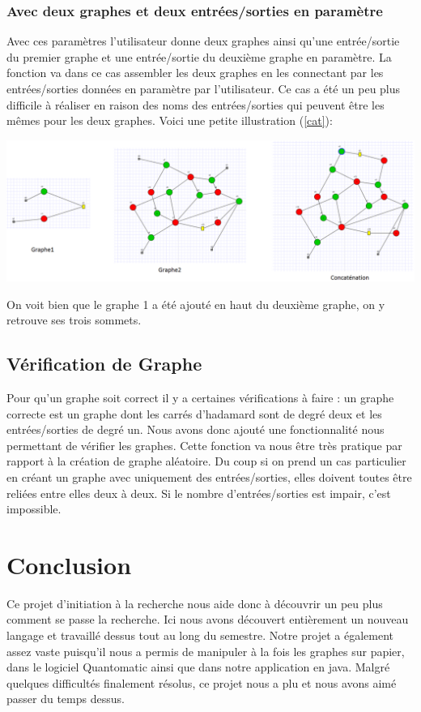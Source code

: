 \documentclass[a4paper,oneside]{book}
\begin{document}
\subsection{Avec deux graphes et deux entrées/sorties en paramètre}
Avec ces paramètres l'utilisateur donne deux graphes ainsi qu'une entrée/sortie du premier graphe et une entrée/sortie du deuxième graphe en paramètre. La fonction va dans ce cas assembler les deux graphes en les connectant par les entrées/sorties données en paramètre par l'utilisateur. Ce cas a été un peu plus difficile à réaliser en raison des noms des entrées/sorties qui peuvent être les mêmes pour les deux graphes. Voici une petite illustration (\ref{cat}):

\begin{center}
\begin{minipage}[c]{\textwidth}
\hspace{-1cm}\includegraphics[scale=0.5]{IMG/cat.eps}
\label{cat}
\end{minipage}
\end{center}

On voit bien que le graphe 1 a été ajouté en haut du deuxième graphe, on y retrouve ses trois sommets.

\section{Vérification de Graphe}
Pour qu’un graphe soit correct il y a certaines vérifications  à faire : un graphe correcte est un graphe dont les carrés d'hadamard sont de degré deux et les entrées/sorties de degré un. Nous avons donc ajouté une fonctionnalité nous permettant de vérifier les graphes. Cette fonction va nous être très pratique par rapport à la création de graphe aléatoire. Du coup si on prend un cas particulier en créant un graphe avec uniquement des entrées/sorties, elles doivent toutes être reliées entre elles deux à deux. Si le nombre d'entrées/sorties est impair, c'est impossible.

\chapter*{Conclusion}
Ce projet d'initiation à la recherche nous aide donc à découvrir un peu plus comment se passe la recherche. Ici nous avons découvert entièrement un nouveau langage et travaillé dessus tout au long du semestre. Notre projet a également assez vaste puisqu'il nous a permis de manipuler à la fois les graphes sur papier, dans le logiciel Quantomatic ainsi que dans notre application en java. Malgré quelques difficultés finalement résolus, ce projet nous a plu et nous avons aimé passer du temps dessus.
\newpage
\end{document}
